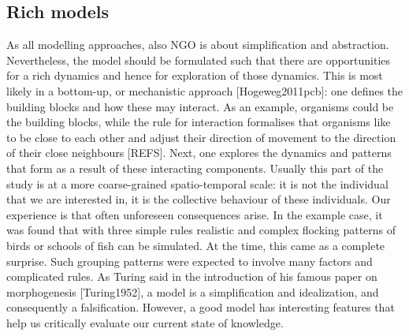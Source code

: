\subsection{Rich models}

As all modelling approaches, also NGO is about simplification and abstraction. Nevertheless, the model should be formulated such that there are opportunities for a rich dynamics and hence for exploration of those dynamics. This is most likely in a bottom-up, or mechanistic approach [Hogeweg2011pcb]: one defines the building blocks and how these may interact. As an example, organisms could be the building blocks, while the rule for interaction formalises that organisms like to be close to each other and adjust their direction of movement to the direction of their close neighbours [REFS]. Next, one explores the dynamics and patterns that form as a result of these interacting components. Usually this part of the study is at a more coarse-grained spatio-temporal scale: it is not the individual that we are interested in, it is the collective behaviour of these individuals. Our experience is that often unforeseen consequences arise. In the example case, it was found that with three simple rules realistic and complex flocking patterns of birds or schools of fish can be simulated. At the time, this came as a complete surprise. Such grouping patterns were expected to involve many factors and complicated rules. As Turing said in the introduction of his famous paper on morphogenesis [Turing1952], a model is a simplification and idealization, and consequently a falsification. However, a good model has interesting features that help us critically evaluate our current state of knowledge.